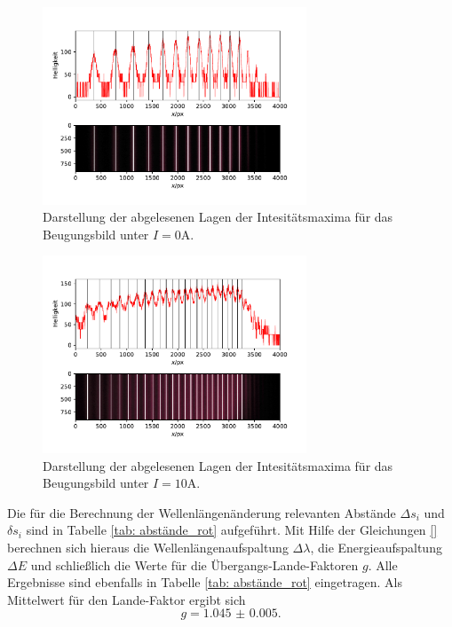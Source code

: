 \begin{figure}
  \centering
  \includegraphics[width = 0.7\textwidth]{../Messdaten/plots/peaks_rot_sigma_0.pdf}
  \caption{Darstellung der abgelesenen Lagen der Intesitätsmaxima für das Beugungsbild unter $I =0$A.}
  \label{fig: peaks_rot_0}
\end{figure}
\begin{figure}
  \centering
  \includegraphics[width = 0.7\textwidth]{../Messdaten/plots/peaks_rot_sigma_10.pdf}
  \caption{Darstellung der abgelesenen Lagen der Intesitätsmaxima für das Beugungsbild unter $I =10$A.}
  \label{fig: peaks_rot_10}
\end{figure}
Die für die Berechnung der Wellenlängenänderung relevanten Abstände $\Delta s_i$ und $\delta s_i$ sind in Tabelle \ref{tab: abstände_rot}
aufgeführt. Mit Hilfe der Gleichungen \eqref{} berechnen sich hieraus die Wellenlängenaufspaltung $\Delta \lambda$, die
Energieaufspaltung $\Delta E$ und schließlich die Werte für die Übergangs-Lande-Faktoren $g$. Alle Ergebnisse sind ebenfalls in
Tabelle \ref{tab: abstände_rot} eingetragen. Als Mittelwert für den Lande-Faktor ergibt sich
\begin{equation}
  g = \num{1.045(5)}.
\end{equation}

